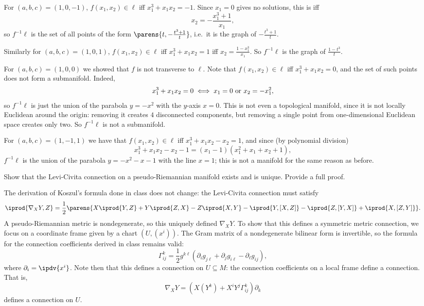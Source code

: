    For $(a,b,c)=(1,0,-1)$, $f(x_1,x_2)\in\ell$ iff $x_1^3+x_1x_2=-1$.
    Since $x_1=0$ gives no solutions, this is iff
    $$ x_2 = -\frac{x_1^3+1}{x_1} , $$
    so $f^{-1}\ell$ is the set of all points of the form $\parens{t,-\frac{t^3+1}t}$, i.e.\ it is the graph of $-\frac{t^3+1}t$.

    Similarly for $(a,b,c)=(1,0,1)$, $f(x_1,x_2)\in\ell$ iff $x_1^3+x_1x_2=1$ iff $x_2=\frac{1-x_1^3}{x_1}$.
    So $f^{-1}\ell$ is the graph of $\frac{1-t^3}t$.

    For $(a,b,c)=(1,0,0)$ we showed that $f$ is not transverse to $\ell$.
    Note that $f(x_1,x_2)\in\ell$ iff $x_1^3+x_1x_2=0$, and the set of such points does not form a submanifold.
    Indeed,
    $$ x_1^3 + x_1x_2 = 0 \iff x_1 = 0 \hbox{ or } x_2 = -x_1^2 , $$
    so $f^{-1}\ell$ is just the union of the parabola $y=-x^2$ with the $y$-axis $x=0$.
    This is not even a topological manifold, since it is not locally Euclidean around the origin: removing it creates $4$ disconnected components, but removing a single
    point from one-dimensional Euclidean space creates only two.
    So $f^{-1}\ell$ is not a submanifold.

    For $(a,b,c)=(1,-1,1)$ we have that $f(x_1,x_2)\in\ell$ iff $x_1^3+x_1x_2-x_2=1$, and since (by polynomial division)
    $$ x_1^3 + x_1x_2 - x_2 - 1 = (x_1-1)(x_1^2 + x_1 + x_2 + 1) , $$
    $f^{-1}\ell$ is the union of the parabola $y=-x^2-x-1$ with the line $x=1$; this is not a manifold for the same reason as before.
\eenum

\bprob

    Show that the Levi-Civita connection on a pseudo-Riemannian manifold exists and is unique.
    Provide a full proof.

\eprob

The derivation of Koszul's formula done in class does not change: the Levi-Civita connection must satisfy
$$ \iprod{\nabla_XY,Z} = \frac12\parens{X\iprod{Y,Z} + Y\iprod{Z,X} - Z\iprod{X,Y}
- \iprod{Y,[X,Z]} - \iprod{Z,[Y,X]} + \iprod{X,[Z,Y]}} . $$
A pseudo-Riemannian metric is nondegenerate, so this uniquely defined $\nabla_XY$.
To show that this defines a symmetric metric connection, we focus on a coordinate frame given by a chart $(U,(x^i))$.
The Gram matrix of a nondegenerate bilinear form is invertible, so the formula for the connection coefficients derived in class
remains valid:
$$ \Gamma^k_{ij} = \frac12g^{k\ell}(\partial_ig_{j\ell} + \partial_jg_{i\ell} - \partial_\ell g_{ij}) , $$
where $\partial_i=\ipdv{x^i}$.
Note then that this defines a connection on $U\subseteq M$: the connection coefficients on a local frame define a connection.
That is,
$$ \nabla_XY = (X(Y^k) + X^iY^j\Gamma^k_{ij})\partial_k $$
defines a connection on $U$.

